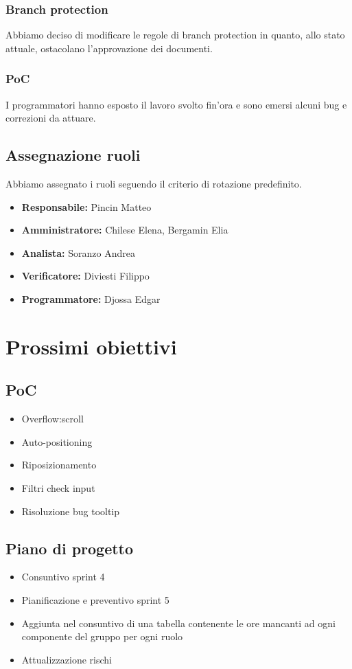 \subsubsection{Branch protection}
Abbiamo deciso di modificare le regole di branch protection in quanto, allo stato attuale, ostacolano l'approvazione dei documenti.

\subsubsection{PoC}
I programmatori hanno esposto il lavoro svolto fin'ora e sono emersi alcuni bug e correzioni da attuare.

\subsection{Assegnazione ruoli}
Abbiamo assegnato i ruoli seguendo il criterio di rotazione predefinito.
\begin{itemize}
    \item \textbf{Responsabile:} Pincin Matteo
    \item \textbf{Amministratore:} Chilese Elena, Bergamin Elia
    \item \textbf{Analista:} Soranzo Andrea
    \item \textbf{Verificatore:} Diviesti Filippo
    \item \textbf{Programmatore:} Djossa Edgar 
\end{itemize}

\section{Prossimi obiettivi}

\subsection{PoC}
\begin{itemize}
    \item Overflow:scroll
    \item Auto-positioning
    \item Riposizionamento
    \item Filtri check input
    \item Risoluzione bug tooltip
\end{itemize}

\subsection{Piano di progetto}
\begin{itemize}
    \item Consuntivo sprint 4
    \item Pianificazione e preventivo sprint 5
    \item Aggiunta nel consuntivo di una tabella contenente le ore mancanti ad ogni componente del gruppo per ogni ruolo
    \item Attualizzazione rischi
\end{itemize}

